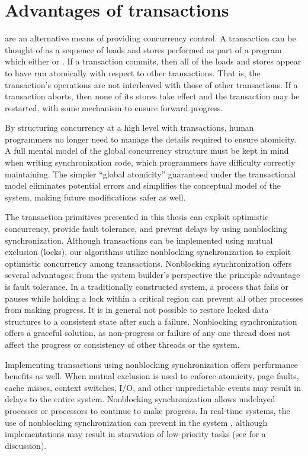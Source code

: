 \section{Advantages of transactions}

 are
an alternative means of providing concurrency control.
A transaction can be thought of as a sequence of loads and stores
performed as part of a program which either
 or .  If a transaction
commits, then all of the loads and stores appear to have run
atomically with respect to other transactions.  That is, the
transaction's operations are not interleaved with those of other
transactions.  If a transaction aborts, then none of its stores take
effect and the transaction may be restarted, with some mechanism to
ensure forward progress.

By structuring concurrency at a high level with transactions, human
programmers no longer need to manage the details required to ensure
atomicity.  A full mental model of the global concurrency structure
must be kept in mind when writing synchronization code, which
programmers have difficulty correctly maintaining.
The simpler ``global atomicity'' guaranteed under the
transactional model eliminates potential errors and simplifies the conceptual
model of the system, making future modifications safer as
well.

The transaction primitives presented in this thesis can exploit
optimistic concurrency, provide fault tolerance, and prevent delays by
using nonblocking synchronization.  Although transactions can be
implemented using mutual exclusion (locks), our algorithms
utilize nonblocking synchronization 
\cite{Lamport77,Herlihy88,HerlihyLuMo03,MassalinPu91,GreenwaldCh96} to
exploit optimistic concurrency among transactions.  Nonblocking
synchronization offers several advantages; from the system
builder's perspective the principle advantage is fault tolerance.
In a traditionally constructed system, a process that
fails or pauses while holding a lock within a critical region can
prevent all other processes from making progress.  It is in general
not possible to restore locked data structures to a
consistent state after such a failure.  Nonblocking synchronization
offers a graceful solution, as non-progress or failure
of any one thread does not affect the progress or consistency of other
threads or the system.

Implementing transactions using
nonblocking synchronization offers performance benefits as well.
When mutual exclusion is used to enforce atomicity, page
faults, cache misses, context
switches, I/O, and other unpredictable events may result in delays to the
entire system. Nonblocking
synchronization allows undelayed processes or processors to continue
to make progress.
In real-time systems, the use of nonblocking
synchronization can prevent 
 in the system
\cite{Jones97}, although \naive implementations may result in
starvation of low-priority tasks (see  for a discussion).

